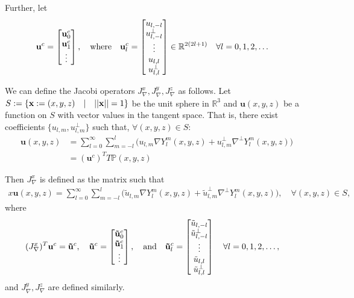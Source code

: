 \documentclass[11pt, oneside]{article}   	%
\newcommand{\R}{\mathbb{R}}
\newcommand{\gradP}{T\mathbb{P}}
\newcommand{\gradYlm}{\nabla Y^m_l}
\newcommand{\gradpYlm}{\nabla^\perp Y^m_l}
\begin{document}
Further, let
\begin{align}
\bold{u}^c = \begin{bmatrix}
			\bold{u}_0^c \\
			\bold{u}_1^c \\
			\vdots \\
		    \end{bmatrix},		  
\quad
\text{where}
\quad
\bold{u}^c_l &= \begin{bmatrix}
				u_{l,-l} \\
				u^{\perp}_{l,-l} \\
				\vdots \\
				u_{l,l} \\
				u^{\perp}_{l,l}
		        \end{bmatrix} \in \R^{2(2l+1)} \quad \forall l = 0,1,2,\dots
\end{align}

We can define the Jacobi operators \(J_\nabla^x, J_\nabla^y, J_\nabla^z\) as follows. Let $S := \{ \bold{x} := (x,y,z) \quad | \quad ||\bold{x}|| = 1\}$ be the unit sphere in $\R^3$ and $\mathbf{u}(x,y,z)$ be a function on $S$ with vector values in the tangent space. That is, there exist coefficients $\{u_{l,m}, u^\perp_{l,m}\}$ such that, $\forall (x,y,z) \in S$:
\begin{align}
\mathbf{u}(x,y,z) &= \sum_{l=0}^\infty \sum_{m=-l}^l \big( u_{l,m} \gradYlm(x,y,z) + u^\perp_{l,m} \gradpYlm(x,y,z) \big) \\
&= (\mathbf{u}^c)^T \gradP(x,y,z)
\end{align}

Then \(J_\nabla^x\) is defined as the matrix such that 
\begin{align}
x \mathbf{u}(x,y,z) = \sum_{l=0}^\infty \sum_{m=-l}^l \big( \tilde{u}_{l,m} \gradYlm(x,y,z) + \tilde{u}^\perp_{l,m} \gradpYlm(x,y,z) \big), \quad \forall (x,y,z) \in S,
\end{align}
where
\begin{align}
(J_\nabla^x)^T \mathbf{u}^c = \mathbf{\tilde{u}}^c,
\quad
\bold{\tilde{u}}^c = \begin{bmatrix}
			\bold{\tilde{u}}_0^c \\
			\bold{\tilde{u}}_1^c \\
			\vdots \\
		    \end{bmatrix},		  
\quad
\text{and}
\quad
\bold{\tilde{u}}^c_l &= \begin{bmatrix}
				\tilde{u}_{l,-l} \\
				\tilde{u}^{\perp}_{l,-l} \\
				\vdots \\
				\tilde{u}_{l,l} \\
				\tilde{u}^{\perp}_{l,l}
		        \end{bmatrix} \quad \forall l = 0,1,2,\dots,
\end{align}
and \(J_\nabla^y, J_\nabla^z\) are defined similarly.
\end{document}
